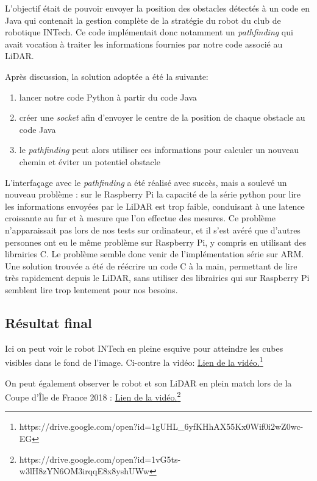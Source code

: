\tab L'objectif était de pouvoir envoyer la position des obstacles détectés à un code en Java qui contenait la gestion complète de la stratégie du robot du club de robotique INTech. Ce code implémentait donc notamment un \textit{pathfinding} qui avait vocation à traiter les informations fournies par notre code associé au LiDAR.  

Après discussion, la solution adoptée a été la suivante:
\begin{enumerate}
    \item lancer notre code Python à partir du code Java
    \item créer une \textit{socket} afin d'envoyer le centre de la position de chaque obstacle au code Java
    \item le \textit{pathfinding} peut alors utiliser ces informations pour calculer un nouveau chemin et éviter un potentiel obstacle
\end{enumerate}
\tab L'interfaçage avec le \textit{pathfinding} a été réalisé avec succès, mais a soulevé un nouveau problème : sur le Raspberry Pi la capacité de la série python pour lire les informations envoyées par le LiDAR est trop faible, conduisant à une latence croissante au fur et à mesure que l'on effectue des mesures. Ce problème n'apparaissait pas lors de nos tests sur ordinateur, et il s'est avéré que d'autres personnes ont eu le même problème sur Raspberry Pi, y compris en utilisant des librairies C. Le problème semble donc venir de l'implémentation série sur ARM. Une solution trouvée a été de réécrire un code C à la main, permettant de lire très rapidement depuis le LiDAR, sans utiliser des librairies qui sur Raspberry Pi semblent lire trop lentement pour nos besoins.

\subsection{Résultat final}

\tab Ici on peut voir le robot INTech en pleine esquive pour atteindre les cubes visibles dans le fond de l'image. Ci-contre la vidéo:  \href{https://drive.google.com/open?id=1gUHL_6yfKHhAX55Kx0Wif0i2wZ0wc-EG}{Lien de la vidéo.}\footnote{https://drive.google.com/open?id=1gUHL\_6yfKHhAX55Kx0Wif0i2wZ0wc-EG}

On peut également observer le robot et son LiDAR en plein match lors de la Coupe d'Île de France 2018 :
\href{https://drive.google.com/open?id=1vG5ts-w3lH8zYN6OM3irqqE8x8yshUWw}{Lien de la vidéo.}\footnote{https://drive.google.com/open?id=1vG5ts-w3lH8zYN6OM3irqqE8x8yshUWw}